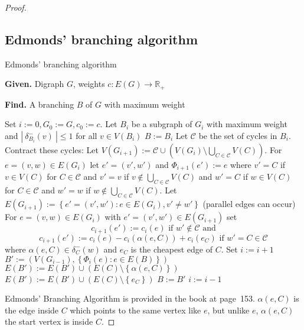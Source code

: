 \documentclass{article}
\newcommand{\card}[1]{\left|\:\!#1\:\!\right|}
\newcommand{\set}[1]{\left\{#1\right\}}
\newcommand{\given}[1]{\textbf{Given.} #1\par}
\newcommand{\find}[1]{\textbf{Find.} #1\par}
\begin{document}
\begin{proof}
\subsection{Edmonds' branching algorithm}
%
\begin{algorithm}
  \caption{Edmonds' branching algorithm}
  \label{edmonds-branching-algo}
  \given{Digraph $G$, weights $c: E(G) \rightarrow \mathbb{R}_+$}
  \find{A branching $B$ of $G$ with maximum weight}
\begin{algorithmic}[1]
  \State Set $i := 0, G_0 := G, c_0 := c$.
  \State Let $B_i$ be a subgraph of $G_i$ with maximum weight and $\card{\delta_{B_i}^-(v)} \leq 1$ for all $v \in V(B_i)$\label{eba-step-2}
    \State $B := B_i$
  \EndIf
  \State Let $\mathcal{C}$ be the set of cycles in $B_i$. Contract these cycles:
  \State Let $V(G_{i+1}) := \mathcal{C} \cup (V(G_i) \setminus \bigcup_{C \in \mathcal{C}} V(C))$.
  \State For $e = (v, w) \in E(G_i)$ let $e' = (v', w')$ and $\Phi_{i+1}(e') := e$ where $v' = C$ if $v \in V(C)$ for $C \in \mathcal{C}$ and $v' = v$ if $v \notin \bigcup_{C \in \mathcal{C}} V(C)$ and $w' = C$ if $w \in V(C)$ for $C \in \mathcal{C}$ and $w' = w$ if $w \notin \bigcup_{C \in \mathcal{C}} V(C)$.
  \State Let $E(G_{i+1}) := \set{e' = (v', w'): e \in E(G_i), v' \neq w'}$ (parallel edges can occur)
  \State For $e = (v, w) \in E(G_i)$ with $e' = (v', w') \in E(G_{i+1})$ set
    \[ c_{i+1}(e') := c_i(e) \text{ if } w' \notin \mathcal{C} \text{ and} \]
    \[ c_{i+1}(e') := c_i(e) - c_i(\alpha(e, C)) + c_i(e_C) \text{ if } w' = C \in \mathcal{C} \]
    where $\alpha(e, C) \in \delta^-_C(w)$ and $e_C$ is the cheapest edge of $C$.
  \State Set $i := i + 1$
    \State $B' := (V(G_{i-1}), \set{\Phi_i(e): e \in E(B)})$
        \State $E(B') := E(B') \cup (E(C) \setminus \set{\alpha(e, C)})$
      \Else
        \State $E(B') := E(B') \cup (E(C) \setminus \set{e_C})$
      \EndIf
    \EndFor
    \State $B := B'$
    \State $i := i - 1$
  \EndWhile
\end{algorithmic}
\end{algorithm}


Edmonds' Branching Algorithm is provided in the book at page~153.
$\alpha(e, C)$ is the edge inside $C$ which points to the same vertex like $e$, but unlike $e$, $\alpha(e, C)$ the start vertex is inside $C$.
\end{proof}
\end{document}

